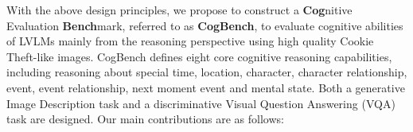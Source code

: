 With the above design principles, we propose to construct a \textbf{Cog}nitive Evaluation \textbf{Bench}mark, referred to as \textbf{CogBench}, to evaluate cognitive abilities of LVLMs mainly from the reasoning perspective using high quality Cookie Theft-like images.
CogBench defines eight core cognitive reasoning capabilities, including reasoning about special time, location, character, character relationship, event, event relationship, next moment event and mental state. 
Both a generative Image Description task and a discriminative Visual Question Answering (VQA) task are designed.
Our main contributions are as follows:

